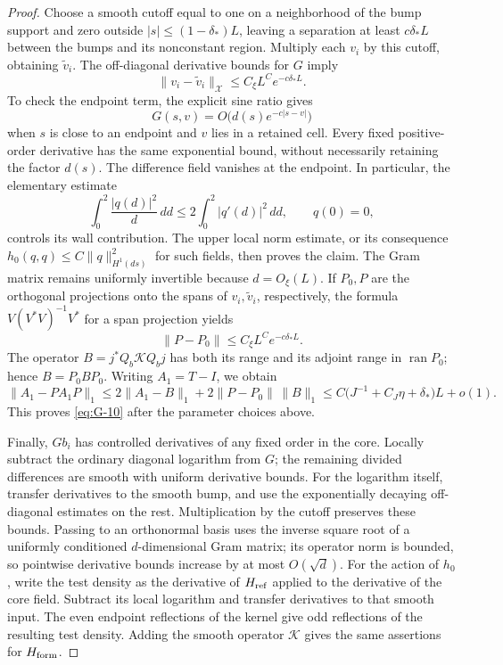 \begin{proof}
Choose a smooth cutoff equal to one on a neighborhood of the bump
support and zero outside \(|s|\le(1-\delta_*)L\), leaving a separation
at least \(c\delta_*L\) between the bumps and its nonconstant region.
Multiply each \(v_i\) by this cutoff, obtaining \(\widetilde v_i\).
The off-diagonal derivative bounds for \(G\) imply
\[
 \|v_i-\widetilde v_i\|_{\mathcal X}
       \le C_\xi L^C e^{-c\delta_*L}.
\]
To check the endpoint term, the explicit sine ratio gives
\[
 G(s,v)=O\bigl(d(s)e^{-c|s-v|}\bigr)
\]
when \(s\) is close to an endpoint and \(v\) lies in a retained cell.
Every fixed positive-order derivative has the same exponential bound,
without necessarily retaining the factor \(d(s)\). The difference
field vanishes at the endpoint. In particular, the elementary estimate
\[
 \int_0^2\frac{|q(d)|^2}{d}\,dd
 \le 2\int_0^2|q'(d)|^2\,dd,\qquad q(0)=0,
\]
controls its wall contribution.
The upper local norm estimate, or its consequence
\(h_0(q,q)\le C\|q\|_{H^1(ds)}^2\) for such fields, then proves the
claim. The Gram matrix remains uniformly invertible because
\(d=O_\xi(L)\). If \(P_0,P\) are the orthogonal projections onto the
spans of \(v_i,\widetilde v_i\), respectively, the formula
\(V(V^*V)^{-1}V^*\) for a span projection yields
\[
 \|P-P_0\|\le C_\xi L^C e^{-c\delta_*L}.
\]
The operator \(B=j^*Q_b\mathscr KQ_bj\) has both its range and its
adjoint range in \(\operatorname{ran}P_0\); hence \(B=P_0BP_0\).
Writing \(A_1=T-I\), we obtain
\[
 \|A_1-PA_1P\|_1
 \le2\|A_1-B\|_1+2\|P-P_0\|\,\|B\|_1
 \le C\bigl(J^{-1}+C_J\eta+\delta_*\bigr)L+o(1).
\]
This proves \eqref{eq:G-10} after the parameter choices above.

Finally, \(Gb_i\) has controlled derivatives of any fixed order in
the core. Locally subtract the ordinary diagonal logarithm from \(G\);
the remaining divided differences are smooth with uniform derivative
bounds. For the logarithm itself, transfer derivatives to the smooth
bump, and use the exponentially decaying off-diagonal estimates on the
rest. Multiplication by the cutoff preserves these bounds. Passing to
an orthonormal basis uses the inverse square root of a uniformly
conditioned \(d\)-dimensional Gram matrix; its operator norm is bounded,
so pointwise derivative bounds increase by at most \(O(\sqrt d)\).
For the action of \(h_0\), write the test density as the derivative of
\(H_{\rm ref}\) applied to the derivative of the core field. Subtract
its local logarithm and transfer derivatives to that smooth input.
The even endpoint reflections of the kernel give odd reflections of
the resulting test density. Adding the smooth operator \(\mathscr K\)
gives the same assertions for \(H_{\rm form}\).
\end{proof}

